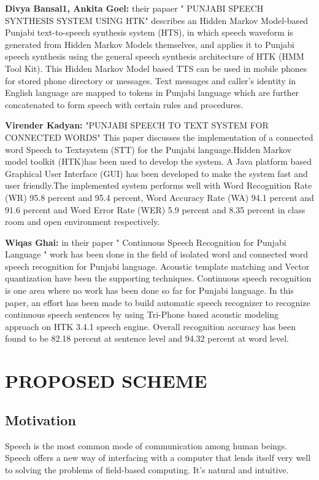 \documentclass[12pt,a4paper,oldfontcommands]{memoir}
\begin{document}
\textbf{Divya Bansal1, Ankita Goel:} their papaer " PUNJABI SPEECH SYNTHESIS SYSTEM USING HTK" describes an Hidden Markov Model-based Punjabi text-to-speech synthesis system (HTS), in
which speech waveform is generated from Hidden Markov Models themselves, and applies it to Punjabi
speech synthesis using the general speech synthesis architecture of HTK (HMM Tool Kit). This Hidden
Markov Model based TTS can be used in mobile phones for stored phone directory or messages. Text
messages and caller’s identity in English language are mapped to tokens in Punjabi language which are
further concatenated to form speech with certain rules and procedures. 

\textbf{Virender Kadyan:} "PUNJABI SPEECH TO TEXT SYSTEM FOR CONNECTED WORDS" This paper
discusses the implementation of a connected word
Speech to Textsystem (STT) for the Punjabi
language.Hidden Markov model toolkit (HTK)has been
used to develop the system. A Java platform based
Graphical User Interface (GUI) has been developed to
make the system fast and user friendly.The implemented
system performs well with Word Recognition Rate
(WR) 95.8 percent and 95.4 percent, Word Accuracy Rate (WA)
94.1 percent and 91.6 percent and Word Error Rate (WER) 5.9 percent
and 8.35 percent in class room and open environment
respectively. 

\textbf{Wiqas Ghai:} in their paper " Continuous Speech Recognition for Punjabi Language " work has been
done in the field of isolated word and connected word
speech recognition for Punjabi language. Acoustic template
matching and Vector quantization have been the supporting
techniques. Continuous speech recognition is one area where
no work has been done so far for Punjabi language. In this
paper, an effort has been made to build automatic speech
recognizer to recognize continuous speech sentences by
using Tri-Phone based acoustic modeling approach on HTK
3.4.1 speech engine. Overall recognition accuracy has
been found to be 82.18 percent at sentence level and 94.32 percent
at word level.




\chapter{PROPOSED SCHEME}
\section{Motivation}
Speech is the most common mode of communication among human beings. Speech
offers a new way of interfacing with a computer that lends itself very well to solving
the problems of field-based computing. It's natural and intuitive. 
\end{document}
